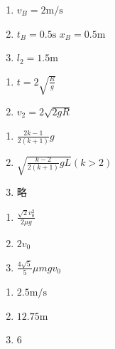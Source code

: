 \item \begin {enumerate} \renewcommand {\labelenumi }{\arabic {enumi}.} \item $v_{B}=2 \mathrm {m} / \mathrm {s}$ \item $t_{B}=0.5 \mathrm {s}$ \qquad $x_{B}=0.5 \mathrm {m}$ \item $l_{2}=1.5 \mathrm {m}$ \end {enumerate} \par \par 
\item \begin {enumerate} \renewcommand {\labelenumi }{\arabic {enumi}.} \item $t=2 \sqrt {\frac {R}{g}}$ \item $v_{2}=2 \sqrt {2 g R}$ \par \end {enumerate} \par \par 
\item \begin {enumerate} \renewcommand {\labelenumi }{\arabic {enumi}.} \item $\frac {2 k-1}{2(k+1)} g$ \item $\sqrt {\frac {k-2}{2(k+1)} g L}(k>2) $ \item 略 \par \par \par \end {enumerate} \par \par 
\item \begin {enumerate} \renewcommand {\labelenumi }{\arabic {enumi}.} \item $\frac {\sqrt {2} v_{0}^{2}}{2 \mu g}$ \item $2 v_{0}$ \item $\frac {4 \sqrt {5}}{5} \mu m g v_{0}$ \par \par \par \end {enumerate} \par \par 
\item \begin {enumerate} \renewcommand {\labelenumi }{\arabic {enumi}.} \item $2.5 \mathrm {m} / \mathrm {s}$ \item $12.75 \mathrm {m}$ \item $ 6 $ \par \par \par \end {enumerate} \par \par 
